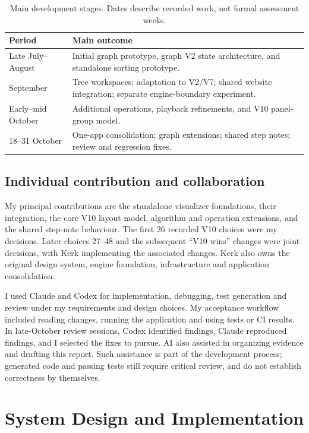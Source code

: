 \documentclass[11pt,a4paper]{article}
\newcommand{\page}{\par\vspace{8pt}}
\begin{document}
\begin{table}[tbp]\small\centering
\caption{Main development stages. Dates describe recorded work, not formal assessment weeks.}\label{tab:timeline}
\begin{tabularx}{\linewidth}{@{}p{27mm}X@{}}\toprule
Period & Main outcome\\\midrule
Late July--August & Initial graph prototype, graph V2 state architecture, and standalone sorting prototype.\\
September & Tree workspaces; adaptation to V2/V7; shared website integration; separate engine-boundary experiment.\\
Early--mid October & Additional operations, playback refinements, and V10 panel-group model.\\
18--31 October & One-app consolidation; graph extensions; shared step notes; review and regression fixes.\\
\bottomrule
\end{tabularx}
\end{table}

\subsection{Individual contribution and collaboration}
My principal contributions are the standalone visualizer foundations, their integration, the core V10 layout model, algorithm and operation extensions, and the shared step-note behaviour. The first 26 recorded V10 choices were my decisions. Later choices 27--48 and the subsequent ``V10 wins'' changes were joint decisions, with Kerk implementing the associated changes. Kerk also owns the original design system, engine foundation, infrastructure and application consolidation.

I used Claude and Codex for implementation, debugging, test generation and review under my requirements and design choices. My acceptance workflow included reading changes, running the application and using tests or CI results. In late-October review sessions, Codex identified findings, Claude reproduced findings, and I selected the fixes to pursue. AI also assisted in organizing evidence and drafting this report. Such assistance is part of the development process; generated code and passing tests still require critical review, and do not establish correctness by themselves.

\page
\section{System Design and Implementation}
\end{document}
